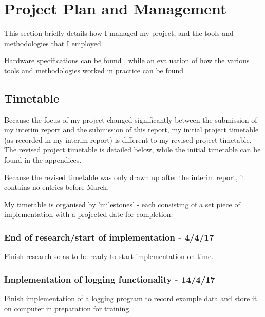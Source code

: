\documentclass[a4paper]{article}
\begin{document}
\newpage
\section{Project Plan and Management}

This section briefly details how I managed my project, and the tools and methodologies that I employed. 

Hardware specifications can be found , while an evaluation of how the various tools and methodologies worked in practice can be found 

\subsection{Timetable}%

Because the focus of my project changed significantly between the submission of my interim report and the submission of this report, my initial project timetable (as recorded in my interim report) is different to my revised project timetable. The revised project timetable is detailed below, while the initial timetable can be found in the appendices.

Because the revised timetable was only drawn up after the interim report, it contains no entries before March.

My timetable is organised by 'milestones' - each consisting of a set piece of implementation with a projected date for completion.

\subsubsection{End of research/start of implementation - 4/4/17}

Finish research so as to be ready to start implementation on time.

\subsubsection{Implementation of logging functionality - 14/4/17}

Finish implementation of a logging program to record example data and store it on computer in preparation for training.
\end{document}
